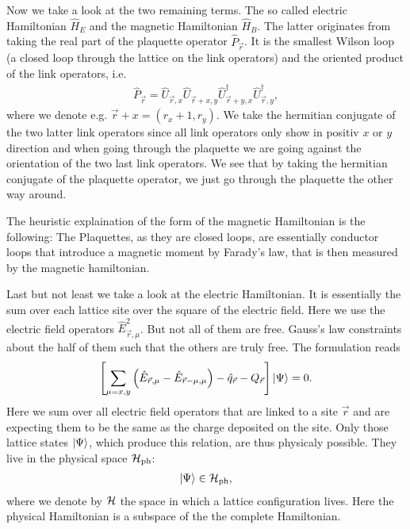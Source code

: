 Now we take a look at the two remaining terms. The so called electric Hamiltonian $\hat{H}_E$ and the magnetic Hamiltonian $\hat{H}_B$. The latter originates from taking the real part of the plaquette operator $\hat{P}_{\vec{r}}$. It is the smallest Wilson loop (a closed loop through the lattice on the link operators) and the oriented product of the link operators, i.e.
\begin{align}
	\hat{P}_{\vec{r}}=\hat{U}_{\vec{r}, x}\hat{U}_{\vec{r}+x,y}\hat{U}^{\dag}_{\vec{r}+y,x}\hat{U}^{\dag}_{\vec{r},y},
\end{align}
where we denote e.g. $\vec{r}+x=(r_x+1,r_y)$. We take the hermitian conjugate of the two latter link operators since all link operators only show in positiv $x$ or $y$ direction and when going through the plaquette we are going against the orientation of the two last link operators. We see that by taking the hermitian conjugate of the plaquette operator, we just go through the plaquette the other way around.

The heuristic explaination of the form of the magnetic Hamiltonian is the following: The Plaquettes, as they are closed loops, are essentially conductor loops that introduce a magnetic moment by Farady's law, that is then measured by the magnetic hamiltonian. %

Last but not least we take a look at the electric Hamiltonian. It is essentially the sum over each lattice site over the square of the electric field. Here we use the electric field operators $\hat{E}^{2}_{\vec{r},\mu}$. But not all of them are free. Gauss's law constraints about the half of them such that the others are truly free. The formulation reads
\begin{align}
  \left[\sum_{\mu=x,y}\left(\hat{E}_{\vec{r},\mu}-\hat{E}_{\vec{r}-\mu,\mu}\right)-\hat{q}_{\vec{r}}-Q_{\vec{r}}\right]\ket{\Psi}=0.
\end{align}
Here we sum over all electric field operators that are linked to a site $\vec{r}$ and are expecting them to be the same as the charge deposited on the site. Only those lattice states $\ket{\Psi}$, which produce this relation, are thus physicaly possible. They live in the physical space $\cal{H}_{\text{ph}}$:
\begin{align}
	\ket{\Psi}\in\cal{H}_{\text{ph}},
\end{align}
where we denote by $\cal{H}$ the space in which a lattice configuration lives. Here the physical Hamiltonian is a subspace of the the complete Hamiltonian.

